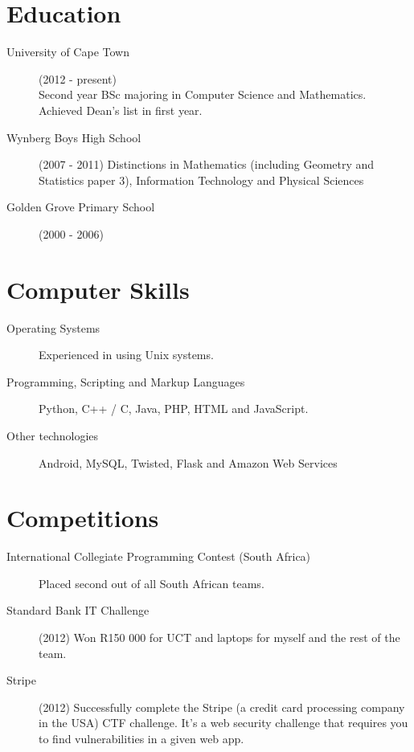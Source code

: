 \documentclass[margin,line,a4paper]{resume}
\begin{document}
\begin{resume}
        \section{\mysidestyle Education}
            \begin{description}
                \item[University of Cape Town] (2012 - present) \\
                    Second year BSc majoring in Computer Science and Mathematics. \\
                    Achieved Dean's list in first year.
                \item[Wynberg Boys High School] (2007 - 2011)
                  Distinctions in Mathematics (including Geometry and Statistics paper 3), Information Technology and Physical Sciences
                \item[Golden Grove Primary School] (2000 - 2006)
            \end{description}

        \section{\mysidestyle Computer Skills}
            \begin{description}
                \item [Operating Systems] Experienced in using Unix systems.

                \item [Programming, Scripting and Markup Languages] Python, C++ / C, Java, PHP, HTML and JavaScript.

                \item [Other technologies] Android, MySQL, Twisted, Flask and Amazon Web Services
            \end{description}

        \section{\mysidestyle Competitions}
            \begin{description}
                \item [International Collegiate Programming Contest (South Africa)] Placed second out of all South African teams.
                \item [Standard Bank IT Challenge] (2012) Won R150 000 for UCT and laptops for myself and the rest of the team.
                \item [Stripe] (2012) Successfully complete the Stripe (a credit card processing company in the USA) CTF challenge. 
                    It's a web security challenge that requires you to find vulnerabilities in a given web app.


\end{description}
\end{resume}
\end{document}
